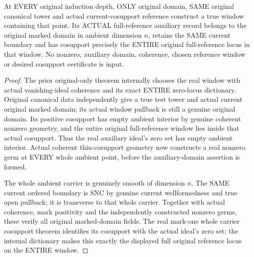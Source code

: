\begin{theorem}
\label{hir:original-full-reference-original-only-auxiliary-marked-domain}
\leanok
{}
At EVERY original induction depth, ONLY original domain, SAME original
canonical tower and actual current-cosupport reference construct a true
window containing that point. Its ACTUAL full-reference auxiliary record
belongs to the original marked domain in ambient dimension $n$, retains the
SAME current boundary and has cosupport precisely the ENTIRE original
full-reference locus in that window. No nonzero, auxiliary domain,
coherence, chosen reference window or desired cosupport certificate is input.
\end{theorem}
\begin{proof}
The prior original-only theorem internally chooses the real window with
actual vanishing-ideal coherence and its exact ENTIRE zero-locus dictionary.
Original canonical data independently give a true test tower and actual
current original marked domain; its actual window pullback is still a
genuine original domain. Its positive cosupport has empty ambient interior
by genuine coherent nonzero geometry, and the entire original full-reference
window lies inside that actual cosupport. Thus the real auxiliary ideal's
zero set has empty ambient interior. Actual coherent thin-cosupport geometry
now constructs a real nonzero germ at EVERY whole ambient point, before the
auxiliary-domain assertion is formed.

The whole ambient carrier is genuinely smooth of dimension $n$. The SAME
current ordered boundary is SNC by genuine current wellformedness and true
open pullback; it is transverse to that whole carrier. Together with actual
coherence, mark positivity and the independently constructed nonzero germs,
these verify all original marked-domain fields. The real mark-one whole
carrier cosupport theorem identifies its cosupport with the actual ideal's
zero set; the internal dictionary makes this exactly the displayed full
original reference locus on the ENTIRE window.
\end{proof}

